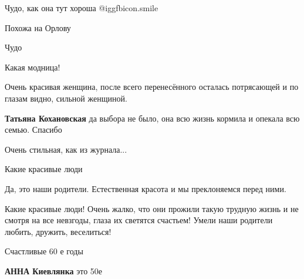  
 
 
 
 

Чудо, как она тут хороша  @igg{fbicon.smile} 

Похожа на Орлову

Чудо

Какая модница!

Очень красивая женщина, после всего перенесённого осталась потрясающей и по
глазам видно, сильной женщиной.

\textbf{Татьяна Кохановская} да выбора не было, она всю жизнь кормила и опекала всю семью. Спасибо


Очень стильная, как из журнала...

Какие красивые люди

Да, это наши родители. Естественная красота и мы преклоняемся перед ними.


Какие красивые люди! Очень жалко, что они прожили такую трудную жизнь и не
смотря на все невзгоды, глаза их светятся счастьем! Умели наши родители
любить, дружить, веселиться!


Счастливые 60 е годы

\textbf{АННА Киевлянка} это 50е
